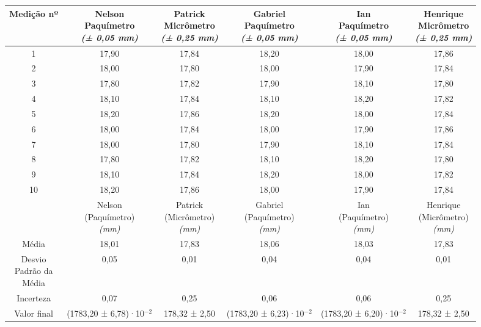 \documentclass{article}
\begin{document}
\begin{table}[h!]
\centering
\begin{tabular}{c c c c c c }
\toprule
Medição nº & \shortstack{Nelson\\Paquímetro\\\textit{(± 0,05 mm)}} & \shortstack{Patrick\\Micrômetro\\\textit{(± 0,25 mm)}} & \shortstack{Gabriel\\Paquímetro\\\textit{(± 0,05 mm)}} & \shortstack{Ian\\Paquímetro\\\textit{(± 0,05 mm)}} & \shortstack{Henrique\\Micrômetro\\\textit{(± 0,25 mm)}}\\
\midrule
1 & 17,90 & 17,84 & 18,20 & 18,00 & 17,86\\
2 & 18,00 & 17,80 & 18,00 & 17,90 & 17,84\\
3 & 17,80 & 17,82 & 17,90 & 18,10 & 17,80\\
4 & 18,10 & 17,84 & 18,10 & 18,20 & 17,82\\
5 & 18,20 & 17,86 & 18,20 & 18,00 & 17,84\\
6 & 18,00 & 17,84 & 18,00 & 17,90 & 17,86\\
7 & 18,00 & 17,80 & 17,90 & 18,10 & 17,84\\
8 & 17,80 & 17,82 & 18,10 & 18,20 & 17,80\\
9 & 18,10 & 17,84 & 18,20 & 18,00 & 17,82\\
10 & 18,20 & 17,86 & 18,00 & 17,90 & 17,84\\
\midrule
&\shortstack{Nelson\\(Paquímetro)\\\textit{(mm)}} & \shortstack{Patrick\\(Micrômetro)\\\textit{(mm)}} & \shortstack{Gabriel\\(Paquímetro)\\\textit{(mm)}} & \shortstack{Ian\\(Paquímetro)\\\textit{(mm)}} & \shortstack{Henrique\\(Micrômetro)\\\textit{(mm)}}\\
\midrule
Média & 18,01 & 17,83 & 18,06 & 18,03 & 17,83\\[3pt]
\shortstack{Desvio\\Padrão da\\Média} & 0,05 & 0,01 & 0,04 & 0,04 & 0,01\\[3pt]
Incerteza & 0,07 & 0,25 & 0,06 & 0,06 & 0,25\\[3pt]
Valor final & (1783,20 ± 6,78)·10$^{-2}$ & 178,32 ± 2,50 & (1783,20 ± 6,23)·10$^{-2}$ & (1783,20 ± 6,20)·10$^{-2}$ & 178,32 ± 2,50\\[3pt]
\bottomrule
\end{tabular}
\end{table}
\end{document}
